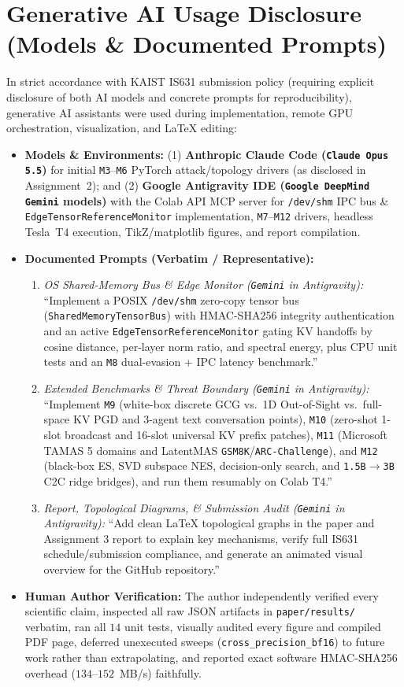 \documentclass[11pt]{article}
\begin{document}
\section{Generative AI Usage Disclosure (Models \& Documented Prompts)}
In strict accordance with KAIST IS631 submission policy (requiring explicit disclosure of both AI models and concrete prompts for reproducibility), generative AI assistants were used during implementation, remote GPU orchestration, visualization, and LaTeX editing:
\begin{itemize}
  \item \textbf{Models \& Environments:} (1) \textbf{Anthropic Claude Code (\texttt{Claude Opus 5.5})} for initial \texttt{M3}--\texttt{M6} PyTorch attack/topology drivers (as disclosed in Assignment~2); and (2) \textbf{Google Antigravity IDE (\texttt{Google DeepMind Gemini} models)} with the Colab API MCP server for \texttt{/dev/shm} IPC bus \& \texttt{EdgeTensorReferenceMonitor} implementation, \texttt{M7}--\texttt{M12} drivers, headless Tesla~T4 execution, TikZ/matplotlib figures, and report compilation.
  \item \textbf{Documented Prompts (Verbatim / Representative):}
  \begin{enumerate}
    \item \emph{OS Shared-Memory Bus \& Edge Monitor (\texttt{Gemini} in Antigravity):} ``Implement a POSIX \texttt{/dev/shm} zero-copy tensor bus (\texttt{SharedMemoryTensorBus}) with HMAC-SHA256 integrity authentication and an active \texttt{EdgeTensorReferenceMonitor} gating KV handoffs by cosine distance, per-layer norm ratio, and spectral energy, plus CPU unit tests and an \texttt{M8} dual-evasion + IPC latency benchmark.''
    \item \emph{Extended Benchmarks \& Threat Boundary (\texttt{Gemini} in Antigravity):} ``Implement \texttt{M9} (white-box discrete GCG vs.\ 1D Out-of-Sight vs.\ full-space KV PGD and 3-agent text conversation points), \texttt{M10} (zero-shot 1-slot broadcast and 16-slot universal KV prefix patches), \texttt{M11} (Microsoft TAMAS 5 domains and LatentMAS \texttt{GSM8K}/\texttt{ARC-Challenge}), and \texttt{M12} (black-box ES, SVD subspace NES, decision-only search, and \texttt{1.5B}$\to$\texttt{3B} C2C ridge bridges), and run them resumably on Colab T4.''
    \item \emph{Report, Topological Diagrams, \& Submission Audit (\texttt{Gemini} in Antigravity):} ``Add clean LaTeX topological graphs in the paper and Assignment 3 report to explain key mechanisms, verify full IS631 schedule/submission compliance, and generate an animated visual overview for the GitHub repository.''
  \end{enumerate}
  \item \textbf{Human Author Verification:} The author independently verified every scientific claim, inspected all raw JSON artifacts in \texttt{paper/results/} verbatim, ran all $14$ unit tests, visually audited every figure and compiled PDF page, deferred unexecuted sweeps (\texttt{cross\_precision\_bf16}) to future work rather than extrapolating, and reported exact software HMAC-SHA256 overhead ($134\text{--}152$~MB/s) faithfully.
\end{itemize}
\end{document}
